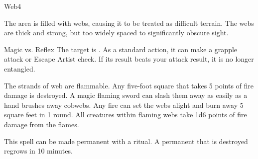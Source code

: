 \begin{spellsection}{Web}{4}
    \begin{spellheader}
    \end{spellheader}
    \begin{spellcontent}
        \begin{spelltargetinginfo}
        \end{spelltargetinginfo}
        \begin{spelleffects}
            \spelleffect The area is filled with webs, causing it to be treated as difficult terrain. The webs are thick and strong, but too widely spaced to significantly obscure sight. %
            \spelldur \durshort \dismissable
        \end{spelleffects}
    \end{spellcontent}
    \begin{spellsubcontent}
        \begin{spelltargetinginfo}
        \end{spelltargetinginfo}
        \begin{spelleffects}
            \begin{spellattack}{Magic vs. Reflex}
                \spellsuccess The target is \immobilized. As a standard action, it can make a grapple attack or Escape Artist check. If its result beats your attack result, it is no longer entangled.
            \end{spellattack}
        \end{spelleffects}
    \end{spellsubcontent}
    \begin{spellfooter}
        \spellnotes The strands of web are flammable. Any five-foot square that takes 5 points of fire damage is destroyed. A magic flaming sword can slash them away as easily as a hand brushes away cobwebs. Any fire can set the webs alight and burn away 5 square feet in 1 round. All creatures within flaming webs take 1d6 points of fire damage from the flames.

        \physicalspellnotes

        This spell can be made permanent with a  ritual. A permanent  that is destroyed regrows in 10 minutes.
        \miscastyou
    \end{spellfooter}
\end{spellsection}

